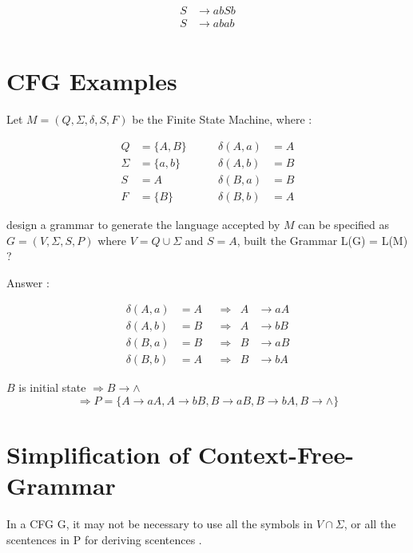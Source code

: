 \documentclass[12pt]{book}
\begin{document}
\begin{align*}
S &\to abSb \\
S &\to abab \\
\end{align*}



\section{CFG Examples}

Let $M = (Q, \Sigma, \delta, S, F)$ be the Finite State Machine, where :

\begin{align*}
Q &= \{ A, B \} &\qquad \delta(A, a) &= A \\
\Sigma &= \{ a, b \} &\qquad \delta(A, b) &= B \\
S &= A  &\qquad \delta(B, a) &= B \\
F &= \{ B \} &\qquad \delta(B, b) &= A
\end{align*}

design a grammar to generate the language accepted by $M$ can be specified as $G=(V, \Sigma, S, P)$ where $V = Q \cup \Sigma$ and $S = A$, built the Grammar L(G) = L(M) ?


Answer :

\begin{align*}
\delta(A, a) &= A & &\Rightarrow  & A &\to aA \\
\delta(A, b) &= B & &\Rightarrow  & A &\to bB \\
\delta(B, a) &= B & &\Rightarrow  & B &\to aB \\
\delta(B, b) &= A & &\Rightarrow  & B &\to bA 
\end{align*}

$B$ is initial state $\Rightarrow B \to \wedge$
$$
\Rightarrow 
P = \{
A \to aA ,
A \to bB ,
B \to aB ,
B \to bA ,
B \to \wedge
\}
$$


\section{Simplification of Context-Free-Grammar}

In a CFG G, it may not be necessary to use all the symbols in $V \cap \Sigma$, or all the scentences in P for deriving scentences .
\end{document}

